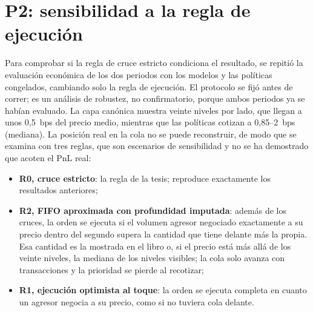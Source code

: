 \section{P2: sensibilidad a la regla de ejecución}
\label{sec:sensibilidad-ejecucion}
 Para comprobar si la regla de cruce estricto condiciona el resultado, se repitió la evaluación económica de los dos periodos con los modelos y las políticas congelados, cambiando solo la regla de ejecución. El protocolo se fijó antes de correr; es un análisis de robustez, no confirmatorio, porque ambos periodos ya se habían evaluado. La capa canónica muestra veinte niveles por lado, que llegan a unos 0,5~bps del precio medio, mientras que las políticas cotizan a 0,85--2~bps (mediana). La posición real en la cola no se puede reconstruir, de modo que se examina con tres reglas, que son escenarios de sensibilidad y no se ha demostrado que acoten el PnL real:
\begin{itemize}[nosep]
\item \textbf{R0, cruce estricto}: la regla de la tesis; reproduce exactamente los resultados anteriores;
\item \textbf{R2, FIFO aproximada con profundidad imputada}: además de los cruces, la orden se ejecuta si el volumen agresor negociado exactamente a su precio dentro del segundo supera la cantidad que tiene delante más la propia. Esa cantidad es la mostrada en el libro o, si el precio está más allá de los veinte niveles, la mediana de los niveles visibles; la cola solo avanza con transacciones y la prioridad se pierde al recotizar;
\item \textbf{R1, ejecución optimista al toque}: la orden se ejecuta completa en cuanto un agresor negocia a su precio, como si no tuviera cola delante.
\end{itemize}

